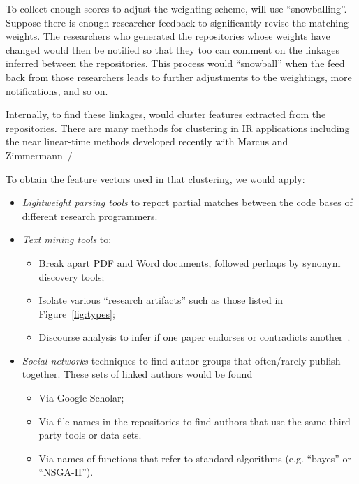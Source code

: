 \documentclass[journal]{IEEEtran}
\newcommand{\bi}{\begin{itemize}}
\newcommand{\ei}{\end{itemize}}
\newcommand{\fig}[1]{Figure~\ref{fig:#1}}
\begin{document}
 
To collect enough scores to adjust the weighting scheme, {\IT} will use ``snowballing''. 
Suppose  there is enough researcher feedback to significantly revise the matching weights.
The researchers who generated the repositories whose weights have changed would then be notified so that they too can comment on the linkages inferred between the repositories.
This process would ``snowball'' when the feed back from those researchers leads to further adjustments to the weightings, more notifications, and so on.
 
Internally, to find these linkages, {\IT}  would cluster features extracted from the repositories.  There are many methods for clustering in IR applications including
the near linear-time methods developed recently with Marcus and Zimmermann~\cite{me12d}/

To  obtain the feature vectors used in that clustering,  we would apply:
\bi
\item {\em Lightweight parsing tools} to report partial matches between the
code bases of different research programmers.
\item
{\em Text mining tools} to:
\bi
\item Break apart PDF and Word documents, followed perhaps by synonym discovery tools;
\item Isolate various ``research artifacts'' such as those listed in \fig{types};
\item Discourse analysis to infer if one paper endorses or  contradicts another~\cite{Pang08}.
\ei
\item
{\em Social networks} techniques to find 
author groups that often/rarely publish together.
These sets of linked authors would be found
\bi
\item
Via Google Scholar;
\item 
Via file names in the repositories to find authors that use the same third-party tools
or data sets.
\item
Via names of functions that refer to standard algorithms (e.g. ``bayes'' or
``NSGA-II'').
\ei
\ei
 


 
\end{document}
